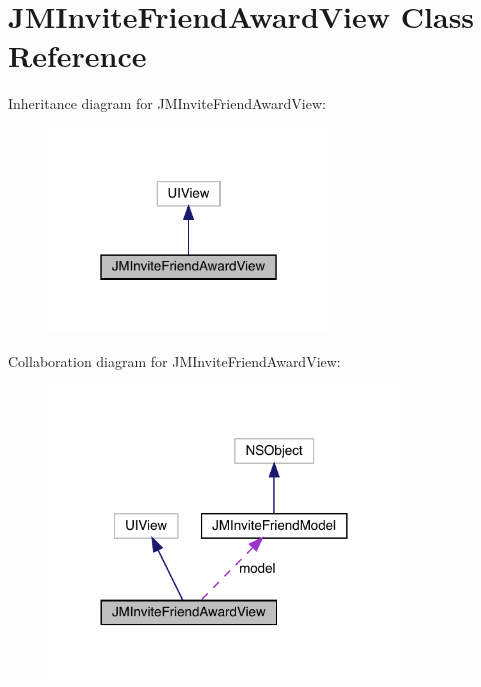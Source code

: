 \hypertarget{interface_j_m_invite_friend_award_view}{}\section{J\+M\+Invite\+Friend\+Award\+View Class Reference}
\label{interface_j_m_invite_friend_award_view}


Inheritance diagram for J\+M\+Invite\+Friend\+Award\+View\+:\nopagebreak
\begin{figure}[H]
\begin{center}
\leavevmode
\includegraphics[width=211pt]{interface_j_m_invite_friend_award_view__inherit__graph}
\end{center}
\end{figure}


Collaboration diagram for J\+M\+Invite\+Friend\+Award\+View\+:\nopagebreak
\begin{figure}[H]
\begin{center}
\leavevmode
\includegraphics[width=264pt]{interface_j_m_invite_friend_award_view__coll__graph}
\end{center}
\end{figure}
